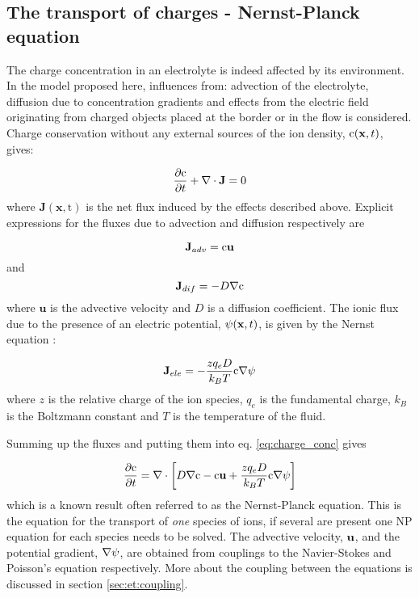 \subsection{The transport of charges - Nernst-Planck equation}\label{sec:et:np}
The charge concentration in an electrolyte is indeed affected by its
environment. In the model proposed here, influences from: advection of
the electrolyte, diffusion due to concentration gradients and effects
from the electric field originating from charged objects placed at the
border or in the flow is considered. Charge conservation without any
external sources of the ion density, $\mathrm{c}(\mathbf{x}, t)$, gives:

\begin{equation}\label{eq:charge_conc}
\dfrac{\partial \mathrm{c}}{\partial t} + \nabla \cdot \mathbf{J} = 0
\end{equation}
where $\mathbf{J(\mathbf{x}, \mathrm{t})}$ is the net flux induced
by the effects described above. Explicit expressions for the fluxes
due to advection and diffusion respectively are 

\begin{equation}
\mathbf{J}_{adv} =
\mathrm{c}\mathbf{u}
\end{equation}
and 
\begin{equation}
\mathbf{J}_{dif} = -D\nabla \mathrm{c} 
\end{equation}
where $\mathbf{u}$ is the advective velocity and $D$ is a diffusion
coefficient. The ionic flux due to the presence of an electric
potential, $\mathrm{\psi}(\mathbf{x}, t)$, is given by the Nernst equation
\cite{dongquing-ren-book}:

\begin{equation}
\mathbf{J}_{ele} = -\frac{zq_eD}{k_BT}\mathrm{c}\nabla\mathrm{\psi}
\end{equation}
where $z$ is the relative charge of the ion species, $q_e$ is the
fundamental charge, $k_B$ is the Boltzmann constant and $T$ is the
temperature of the fluid.

Summing up the fluxes and putting them into eq. \eqref{eq:charge_conc}
gives

\begin{equation}\label{eq:et:np}
\dfrac{\partial \mathrm{c}}{\partial t} = \nabla \cdot \left [
 D\nabla \mathrm{c} - \mathrm{c}\mathbf{u} + \frac{zq_eD}{k_BT}\mathrm{c}\nabla\mathrm{\psi}
\right]
\end{equation}
which is a known result often referred to as the Nernst-Planck
equation. This is the equation for the transport of \emph{one} species
of ions, if several are present one NP equation for each species needs
to be solved. The advective velocity, $\mathbf{u}$, and the potential
gradient, $\nabla \mathrm{\psi}$, are obtained from couplings to the
Navier-Stokes and Poisson's equation respectively. More about the
coupling between the equations is discussed in section
\ref{sec:et:coupling}.





